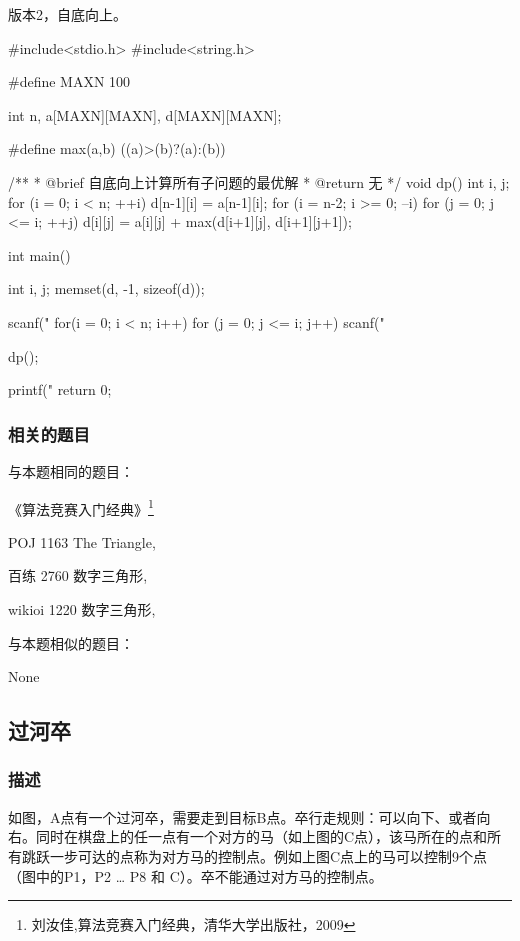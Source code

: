 版本2，自底向上。

\begin{Codex}[label=numbers_triangle2.c]
#include<stdio.h>
#include<string.h>

#define MAXN 100

int n, a[MAXN][MAXN], d[MAXN][MAXN];

#define max(a,b) ((a)>(b)?(a):(b))

/**
 * @brief 自底向上计算所有子问题的最优解
 * @return 无
 */
void dp() {
    int i, j;
    for (i = 0; i < n; ++i) {
        d[n-1][i] = a[n-1][i];
    }
    for (i = n-2; i >= 0; --i)
      for (j = 0; j <= i; ++j)
        d[i][j] = a[i][j] + max(d[i+1][j], d[i+1][j+1]);
}

int main() {
    int i, j;
    memset(d, -1, sizeof(d));

    scanf("%
    for(i = 0; i < n; i++)
      for (j = 0; j <= i; j++) 
          scanf("%

    dp();
    
    printf("%
    return 0;
}
\end{Codex}

\subsubsection{相关的题目}
与本题相同的题目：
\begindot
\item 《算法竞赛入门经典》\footnote{刘汝佳,算法竞赛入门经典，清华大学出版社，2009}
\item POJ 1163 The Triangle, 
\item 百练 2760 数字三角形, 
\item wikioi 1220 数字三角形, 
\myenddot

与本题相似的题目：
\begindot
\item  None
\myenddot


\subsection{过河卒}

\subsubsection{描述}
如图，A点有一个过河卒，需要走到目标B点。卒行走规则：可以向下、或者向右。同时在棋盘上的任一点有一个对方的马（如上图的C点），该马所在的点和所有跳跃一步可达的点称为对方马的控制点。例如上图C点上的马可以控制9个点（图中的P1，P2 … P8 和 C）。卒不能通过对方马的控制点。

